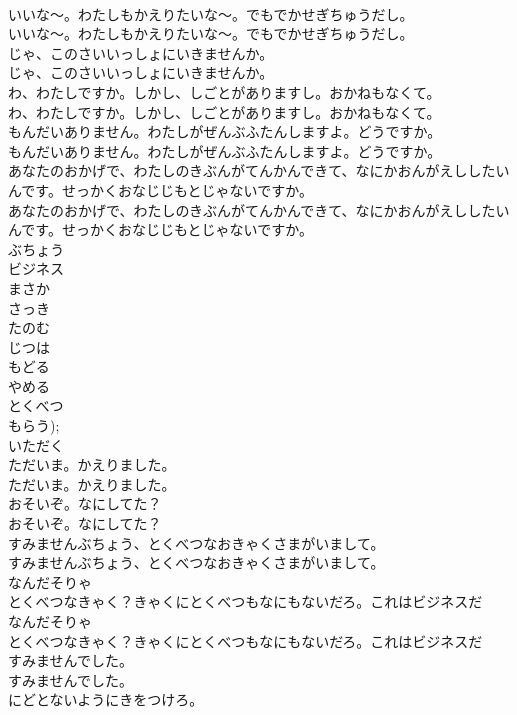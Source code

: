 \documentclass[8pt]{extreport}
\begin{document}
\begin{CJK}{UTF8}{min}
\\	いいな〜。わたしもかえりたいな〜。でもでかせぎちゅうだし。
\\	いいな〜。わたしもかえりたいな〜。でもでかせぎちゅうだし。
\\	じゃ、このさいいっしょにいきませんか。
\\	じゃ、このさいいっしょにいきませんか。
\\	わ、わたしですか。しかし、しごとがありますし。おかねもなくて。
\\	わ、わたしですか。しかし、しごとがありますし。おかねもなくて。
\\	もんだいありません。わたしがぜんぶふたんしますよ。どうですか。
\\	もんだいありません。わたしがぜんぶふたんしますよ。どうですか。
\\	あなたのおかげで、わたしのきぶんがてんかんできて、なにかおんがえししたいんです。せっかくおなじじもとじゃないですか。
\\	あなたのおかげで、わたしのきぶんがてんかんできて、なにかおんがえししたいんです。せっかくおなじじもとじゃないですか。
\\	ぶちょう
\\	ビジネス
\\	まさか
\\	さっき
\\	たのむ
\\	じつは
\\	もどる
\\	やめる
\\	とくべつ
\\	もらう); 
\\	いただく
\\	ただいま。かえりました。
\\	ただいま。かえりました。
\\	おそいぞ。なにしてた？
\\	おそいぞ。なにしてた？
\\	すみませんぶちょう、とくべつなおきゃくさまがいまして。
\\	すみませんぶちょう、とくべつなおきゃくさまがいまして。
\\	なんだそりゃ
\\	とくべつなきゃく？きゃくにとくべつもなにもないだろ。これはビジネスだ
\\	なんだそりゃ
\\	とくべつなきゃく？きゃくにとくべつもなにもないだろ。これはビジネスだ
\\	すみませんでした。
\\	すみませんでした。
\\	にどとないようにきをつけろ。

\end{CJK}
\end{document}
